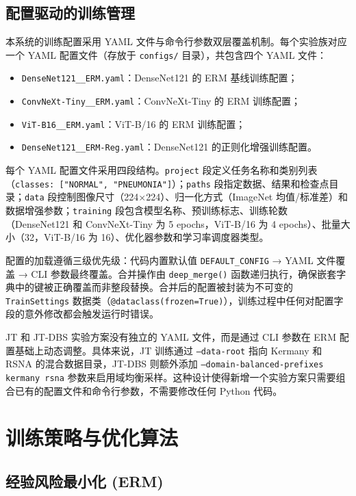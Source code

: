 \documentclass[12pt,a4paper,UTF8,openany]{ctexbook}
\begin{document}
\subsection{配置驱动的训练管理}

本系统的训练配置采用 YAML 文件与命令行参数双层覆盖机制。每个实验族对应一个 YAML 配置文件（存放于 \texttt{configs/} 目录），共包含四个 YAML 文件：

\begin{itemize}
  \item \texttt{DenseNet121\_\_ERM.yaml}：DenseNet121 的 ERM 基线训练配置；
  \item \texttt{ConvNeXt-Tiny\_\_ERM.yaml}：ConvNeXt-Tiny 的 ERM 训练配置；
  \item \texttt{ViT-B16\_\_ERM.yaml}：ViT-B/16 的 ERM 训练配置；
  \item \texttt{DenseNet121\_\_ERM-Reg.yaml}：DenseNet121 的正则化增强训练配置。
\end{itemize}

每个 YAML 配置文件采用四段结构。\texttt{project} 段定义任务名称和类别列表（\texttt{classes: ["NORMAL", "PNEUMONIA"]}）；\texttt{paths} 段指定数据、结果和检查点目录；\texttt{data} 段控制图像尺寸（224×224）、归一化方式（ImageNet 均值/标准差）和数据增强参数；\texttt{training} 段包含模型名称、预训练标志、训练轮数（DenseNet121 和 ConvNeXt-Tiny 为 5 epochs，ViT-B/16 为 4 epochs）、批量大小（32，ViT-B/16 为 16）、优化器参数和学习率调度器类型。

配置的加载遵循三级优先级：代码内置默认值 \texttt{DEFAULT\_CONFIG} → YAML 文件覆盖 → CLI 参数最终覆盖。合并操作由 \texttt{deep\_merge()} 函数递归执行，确保嵌套字典中的键被正确覆盖而非整段替换。合并后的配置被封装为不可变的 \texttt{TrainSettings} 数据类（\texttt{@dataclass(frozen=True)}），训练过程中任何对配置字段的意外修改都会触发运行时错误。

JT 和 JT-DBS 实验方案没有独立的 YAML 文件，而是通过 CLI 参数在 ERM 配置基础上动态调整。具体来说，JT 训练通过 \texttt{--data-root} 指向 Kermany 和 RSNA 的混合数据目录，JT-DBS 则额外添加 \texttt{--domain-balanced-prefixes kermany rsna} 参数来启用域均衡采样。这种设计使得新增一个实验方案只需要组合已有的配置文件和命令行参数，不需要修改任何 Python 代码。

\section{训练策略与优化算法}

\subsection{经验风险最小化 (ERM)}
\end{document}
